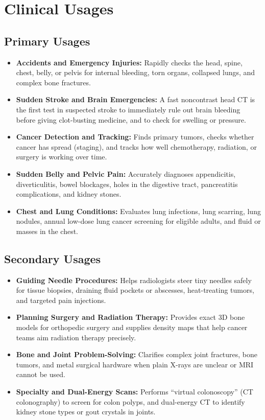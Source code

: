 \section{Clinical Usages}

\subsection{Primary Usages}
\begin{itemize}
    \item \textbf{Accidents and Emergency Injuries:} Rapidly checks the head, spine, chest, belly, or pelvis for internal bleeding, torn organs, collapsed lungs, and complex bone fractures.
    \item \textbf{Sudden Stroke and Brain Emergencies:} A fast noncontrast head CT is the first test in suspected stroke to immediately rule out brain bleeding before giving clot-busting medicine, and to check for swelling or pressure.
    \item \textbf{Cancer Detection and Tracking:} Finds primary tumors, checks whether cancer has spread (staging), and tracks how well chemotherapy, radiation, or surgery is working over time.
    \item \textbf{Sudden Belly and Pelvic Pain:} Accurately diagnoses appendicitis, diverticulitis, bowel blockages, holes in the digestive tract, pancreatitis complications, and kidney stones.
    \item \textbf{Chest and Lung Conditions:} Evaluates lung infections, lung scarring, lung nodules, annual low-dose lung cancer screening for eligible adults, and fluid or masses in the chest.
\end{itemize}

\subsection{Secondary Usages}
\begin{itemize}
    \item \textbf{Guiding Needle Procedures:} Helps radiologists steer tiny needles safely for tissue biopsies, draining fluid pockets or abscesses, heat-treating tumors, and targeted pain injections.
    \item \textbf{Planning Surgery and Radiation Therapy:} Provides exact 3D bone models for orthopedic surgery and supplies density maps that help cancer teams aim radiation therapy precisely.
    \item \textbf{Bone and Joint Problem-Solving:} Clarifies complex joint fractures, bone tumors, and metal surgical hardware when plain X-rays are unclear or MRI cannot be used.
    \item \textbf{Specialty and Dual-Energy Scans:} Performs ``virtual colonoscopy'' (CT colonography) to screen for colon polyps, and dual-energy CT to identify kidney stone types or gout crystals in joints.
\end{itemize}

